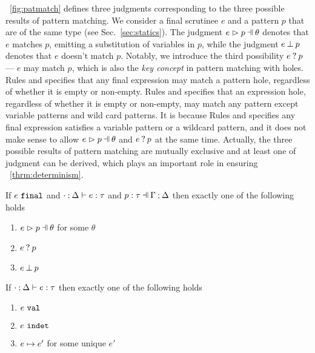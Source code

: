\documentclass[runningheads,envcountsame,a4paper]{llncs}
\begin{document}


\figurename~\ref{fig:patmatch} defines three judgments corresponding to the
three possible results of pattern matching. We consider a final scrutinee $e$
and a pattern $p$ that are of the same type (see Sec.~\ref{sec:statics}). The
judgment $\hpatmatch{e}{p}{\theta}$ denotes that $e$ matches $p$, emitting a
substitution of variables in $p$, while the judgment $e \mathbin{\bot} p$ denotes
that $e$ doesn't match $p$. Notably, we introduce the third possibility
$e \mathbin{?} p$ --- $e$ may match $p$, which is also the \textit{key
concept} in pattern matching with holes. Rules \MMEHole and \MMHole specifies
that any final expression may match a pattern hole, regardless of whether it is
empty or non-empty. Rules \MMExpEHole and \MMExpHole specifies that an
expression hole, regardless of whether it is empty or non-empty, may match any
pattern except variable patterns and wild card patterns. It is because Rules
\MVar and \MWild specifies any final expression satisfies a variable pattern or
a wildcard pattern, and it does not make sense to allow
$\hpatmatch{e}{p}{\theta}$ and $e \mathbin{?} p$ at the same time. Actually,
the three possible results of pattern matching are mutually exclusive and at
least one of judgment can be derived, which plays an important role in ensuring
\theoremname~\ref{thrm:determinism}.

\begin{lemma}
  \label{lem:match-determinism}
  If $e ~\mathtt{final}$ and $\cdot \mathbin{;} \Delta \vdash e : \tau$ and $\hpattyp{p}{\tau}{\Gamma}{\Delta}$ then exactly one of the following holds
  \begin{enumerate}
    \item $\hpatmatch{e}{p}{\theta}$ for some $\theta$
    \item $e \mathbin{?} p$
    \item $e \mathbin{\bot} p$
  \end{enumerate}
\end{lemma}


\begin{theorem}[Determinism]
  \label{thrm:determinism}
  If $\cdot \mathbin{;} \Delta \vdash e : \tau$ then exactly one of the following holds
  \begin{enumerate}
    \item $e ~\mathtt{val}$
    \item $e ~\mathtt{indet}$
    \item $e \mapsto e'$ for some unique $e'$
  \end{enumerate}
\end{theorem}
\end{document}
